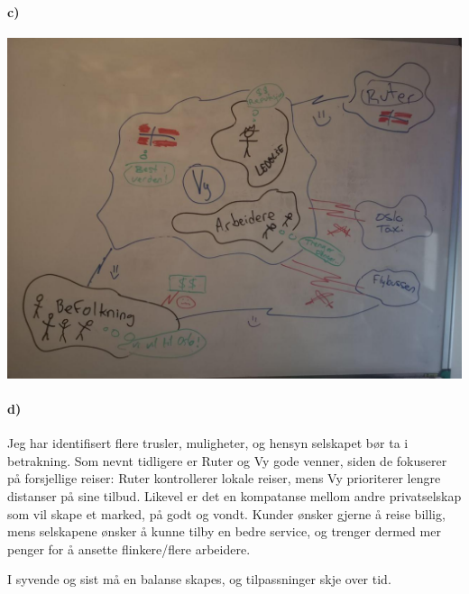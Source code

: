 \documentclass{../../myassignment}
\begin{document}
	\paragraph*{c)}
	\begin{answer}
		\includegraphics[scale=0.4]{vyinteressenter.jpg}

	\end{answer}

	\paragraph*{d)}
	\begin{answer}
		Jeg har identifisert flere trusler, muligheter, og hensyn selskapet bør ta i betrakning. Som nevnt tidligere er Ruter og Vy gode venner, siden de fokuserer på forsjellige reiser: Ruter kontrollerer lokale reiser, mens Vy prioriterer lengre distanser på sine tilbud. Likevel er det en kompatanse mellom andre privatselskap som vil skape et marked, på godt og vondt. Kunder ønsker gjerne å reise billig, mens selskapene ønsker å kunne tilby en bedre service, og trenger dermed mer penger for å ansette flinkere/flere arbeidere. 

		I syvende og sist må en balanse skapes, og tilpassninger skje over tid. 
	\end{answer}
\end{document}
